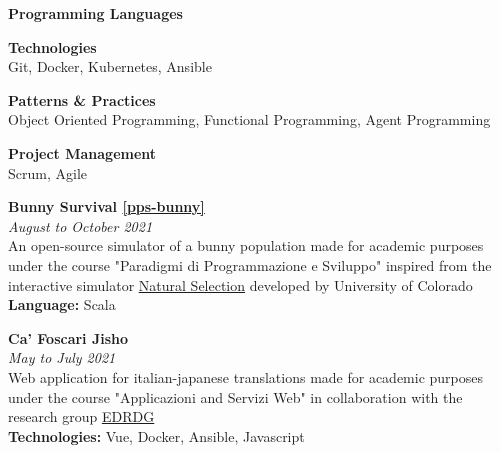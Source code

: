 
\divider


\textbf{Programming Languages} \\ \smallskip
{}

\divider

\textbf{Technologies} \\ \smallskip
Git, Docker, Kubernetes, Ansible

\divider

\textbf{Patterns \& Practices} \\ \smallskip
Object Oriented Programming, Functional Programming, Agent Programming

\divider

\textbf{Project Management} \\ \smallskip
Scrum, Agile
\divider


\textbf{Bunny Survival \href{https://github.com/anitvam/pps-bunny}{[pps-bunny]}}\\
\textit{August to October 2021}\\ \smallskip
An open-source simulator of a bunny population made for academic purposes under the course "Paradigmi di Programmazione e Sviluppo" inspired from the interactive simulator \href{https://phet.colorado.edu/en/simulations/natural-selection}{\underline{Natural Selection}} developed by University of Colorado\\ \smallskip
\textbf{Language:} Scala

\divider


\textbf{\textbf{Ca' Foscari Jisho}}\\
\textit{May to July 2021} \\ \smallskip
Web application for italian-japanese translations made for academic purposes under the course "Applicazioni and Servizi Web" in collaboration with the research group \href{http://www.edrdg.org}{\underline{EDRDG}}\\ \smallskip
\textbf{Technologies:} Vue, Docker, Ansible, Javascript

\divider

\clearpage

